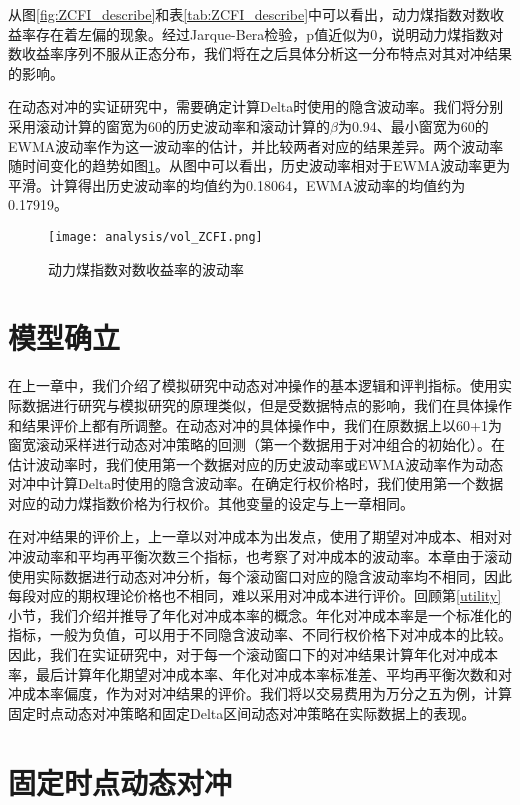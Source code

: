 从图\ref{fig:ZCFI_describe}和表\ref{tab:ZCFI_describe}中可以看出，动力煤指数对数收益率存在着左偏的现象。经过Jarque-Bera检验，p值近似为0，说明动力煤指数对数收益率序列不服从正态分布，我们将在之后具体分析这一分布特点对其对冲结果的影响。

在动态对冲的实证研究中，需要确定计算Delta时使用的隐含波动率。我们将分别采用滚动计算的窗宽为60的历史波动率和滚动计算的$\beta$为0.94、最小窗宽为60的EWMA波动率作为这一波动率的估计，并比较两者对应的结果差异。两个波动率随时间变化的趋势如图\ref{fig:vol_ZCFI}。从图中可以看出，历史波动率相对于EWMA波动率更为平滑。计算得出历史波动率的均值约为0.18064，EWMA波动率的均值约为0.17919。

\begin{figure}[htb]
  \centering
  \texttt{[image: analysis/vol\_ZCFI.png]}
  \caption[这里将出现在插图索引中]
    {动力煤指数对数收益率的波动率}
  \label{fig:vol_ZCFI}
\end{figure}

\section{模型确立}

在上一章中，我们介绍了模拟研究中动态对冲操作的基本逻辑和评判指标。使用实际数据进行研究与模拟研究的原理类似，但是受数据特点的影响，我们在具体操作和结果评价上都有所调整。在动态对冲的具体操作中，我们在原数据上以60+1为窗宽滚动采样进行动态对冲策略的回测（第一个数据用于对冲组合的初始化）。在估计波动率时，我们使用第一个数据对应的历史波动率或EWMA波动率作为动态对冲中计算Delta时使用的隐含波动率。在确定行权价格时，我们使用第一个数据对应的动力煤指数价格为行权价。其他变量的设定与上一章相同。

在对冲结果的评价上，上一章以对冲成本为出发点，使用了期望对冲成本、相对对冲波动率和平均再平衡次数三个指标，也考察了对冲成本的波动率。本章由于滚动使用实际数据进行动态对冲分析，每个滚动窗口对应的隐含波动率均不相同，因此每段对应的期权理论价格也不相同，难以采用对冲成本进行评价。回顾第\ref{utility}小节，我们介绍并推导了年化对冲成本率的概念。年化对冲成本率是一个标准化的指标，一般为负值，可以用于不同隐含波动率、不同行权价格下对冲成本的比较。因此，我们在实证研究中，对于每一个滚动窗口下的对冲结果计算年化对冲成本率，最后计算年化期望对冲成本率、年化对冲成本率标准差、平均再平衡次数和对冲成本率偏度，作为对对冲结果的评价。我们将以交易费用为万分之五为例，计算固定时点动态对冲策略和固定Delta区间动态对冲策略在实际数据上的表现。

\section{固定时点动态对冲}

